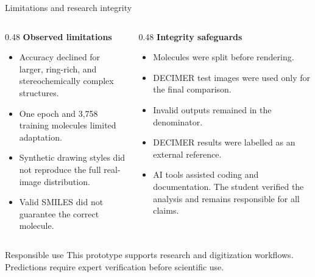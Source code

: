\documentclass[aspectratio=169,10pt]{beamer}
\begin{document}
\begin{frame}{Limitations and research integrity}
  \begin{columns}[T,onlytextwidth]
    \begin{column}{0.48\textwidth}
      \textbf{Observed limitations}
      \begin{itemize}
        \item Accuracy declined for larger, ring-rich, and stereochemically complex structures.
        \item One epoch and 3,758 training molecules limited adaptation.
        \item Synthetic drawing styles did not reproduce the full real-image distribution.
        \item Valid SMILES did not guarantee the correct molecule.
      \end{itemize}
    \end{column}
    \begin{column}{0.48\textwidth}
      \textbf{Integrity safeguards}
      \begin{itemize}
        \item Molecules were split before rendering.
        \item DECIMER test images were used only for the final comparison.
        \item Invalid outputs remained in the denominator.
        \item DECIMER results were labelled as an external reference.
        \item AI tools assisted coding and documentation. The student verified the analysis and remains responsible for all claims.
      \end{itemize}
    \end{column}
  \end{columns}
  \vspace{0.15cm}
  \begin{block}{Responsible use}
    This prototype supports research and digitization workflows. Predictions require expert verification before scientific use.
  \end{block}
\end{frame}
\end{document}
